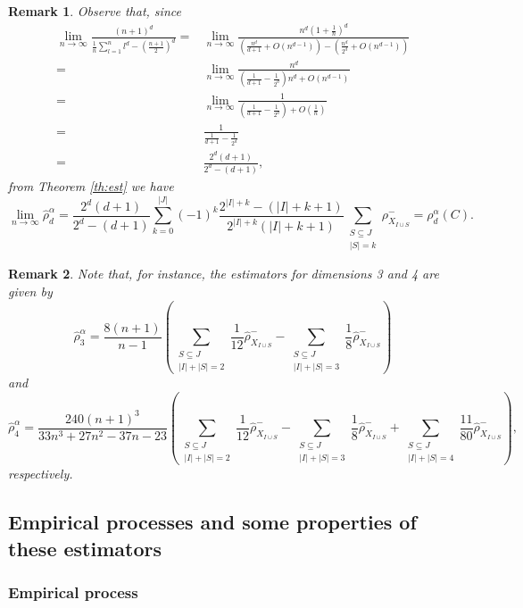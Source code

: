 \documentclass[11pt,a4paper]{article}
\newtheorem{remark}{Remark}
\begin{document}
\begin{remark}Observe that, since
\begin{align*}
\lim_{n \to \infty} \frac{(n+1)^d}{\frac{1}{n}\sum_{l=1}^nl^d-\left(\frac{n+1}{2}\right)^d}=& \lim_{n \to \infty} \frac{n^d\left(1+\frac{1}{n}\right)^d}{\left(\frac{n^d}{d+1} + O(n^{d-1})\right)-\left(\frac{n^d}{2^d} + O(n^{d-1})\right)}\\
=&\lim_{n \to \infty} \frac{n^d}{\left(\frac{1}{d+1} - \frac{1}{2^d}\right)n^d + O(n^{d-1})}\\
=& \lim_{n \to \infty} \frac{1}{\left(\frac{1}{d+1} - \frac{1}{2^d}\right) + O\left(\frac{1}{n}\right)}\\
=&\frac{1}{\frac{1}{d+1} - \frac{1}{2^d}}\\
=& \frac{2^d(d+1)}{2^d-(d+1)},
\end{align*}
from Theorem \ref{th:est} we have
$$\lim_{n \to \infty} \widehat{\rho}_d^{\alpha} = \frac{2^d(d+1)}{2^d-(d+1)} \sum_{k=0}^{|J|} (-1)^k \frac{2^{|I|+k}-(|I|+k+1)}{2^{|I|+k}(|I|+k+1)} \sum_{\substack{S \subseteq J \\ |S|=k}} \rho_{X_{I\cup S}}^- = \rho_d^\alpha(C).$$
\end{remark}

\begin{remark}
Note that, for instance, the estimators for dimensions 3 and 4 are given by
$$\widehat{\rho}_3^{\alpha} = \frac{8(n+1)}{n-1} \left( \sum_{\substack{S \subseteq J \\ |I|+|S|=2}} \frac{1}{12} \widehat{\rho}_{X_{I\cup S}}^- - \sum_{\substack{S \subseteq J \\ |I|+|S|=3}} \frac{1}{8} \widehat{\rho}_{X_{I\cup S}}^- \right)$$
and
$$\widehat{\rho}_4^{\alpha} = \frac{240(n+1)^3}{33n^3+27n^2-37n-23} \left( \sum_{\substack{S \subseteq J \\ |I|+|S|=2}} \frac{1}{12} \widehat{\rho}_{X_{I\cup S}}^- - \sum_{\substack{S \subseteq J \\ |I|+|S|=3}} \frac{1}{8} \widehat{\rho}_{X_{I\cup S}}^- + \sum_{\substack{S \subseteq J \\ |I|+|S|=4}} \frac{11}{80} \widehat{\rho}_{X_{I\cup S}}^- \right),$$
respectively.
\end{remark}

\subsection{Empirical processes and some properties of these estimators}

\subsubsection{Empirical process}
\end{document}
